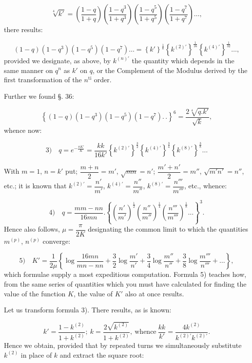 \documentclass{article}
\begin{document}
\[
\sqrt[4]{k'}=\left(\frac{1-q}{1+q}\right)\left(\frac{1-q^{3}}{1+q^{3}}\right)\left(\frac{1-q^{5}}{1+q^{5}}\right)\left(\frac{1-q^{7}}{1+q^{7}}\right)\ldots,
\]
there results:

\[
(1-q)(1-q^{3})(1-q^{5})(1-q^{7})\ldots=\left\{k'\right\}^{\frac{1}{8}}\left\{k^{(2)\prime}\right\}^{\frac{1}{16}}\left\{k^{(4)\prime}\right\}^{\frac{1}{32}}\ldots,
\]
provided we designate, as above, by $k^{(n)\prime}$ the quantity which depends in the same manner on $q^{n}$ as $k'$ on $q$, or the Complement of the Modulus derived by the first transformation of the $n^{\mathrm{ti}}$ order.

Further we found §. 36:

\[
\left\{(1-q)(1-q^{3})(1-q^{5})(1-q^{7}).\,.\right\}^{6}=\frac{2\sqrt[4]{q.k'}}{\sqrt{k}},
\]
whence now:

\[
\text{3)}\quad q=e^{-\frac{\pi K'}{K}}=\frac{kk}{16k'}\left\{k^{(2)\prime}\right\}^{\frac{3}{2}}\left\{k^{(4)\prime}\right\}^{\frac{3}{4}}\left\{k^{(8)\prime}\right\}^{\frac{3}{8}}\ldots
\]

With $m=1$, $n=k'$ put; $\dfrac{m+n}{2}=m'$, $\sqrt{mn}=n'$; $\dfrac{m'+n'}{2}=m''$, $\sqrt{m'n'}=n''$, etc.; it is known that $k^{(2)\prime}=\dfrac{n'}{m'}$, $k^{(4)\prime}=\dfrac{n''}{m''}$, $k^{(8)\prime}=\dfrac{n'''}{m'''}$, etc., whence:

\[
\text{4)}\quad q=\frac{mm-nn}{16mn}.\left\{\left(\frac{n'}{m'}\right)^{\frac{1}{2}}\left(\frac{n''}{m''}\right)^{\frac{1}{4}}\left(\frac{n'''}{m'''}\right)^{\frac{1}{8}}\ldots\right\}^{3}.
\]
Hence also follows, $\mu=\dfrac{\pi}{2K}$ designating the common limit to which the quantities $m^{(p)}$, $n^{(p)}$ converge:

\[
\text{5)}\quad K'=\frac{1}{2\mu}\left\{\log\frac{16mn}{mn-nn}+\frac{3}{2}\log\frac{m'}{n'}+\frac{3}{4}\log\frac{m''}{n''}+\frac{3}{8}\log\frac{m'''}{n'''}+\ldots\right\},
\]
which formulae supply a most expeditious computation. Formula 5) teaches how, from the same series of quantities which you must have calculated for finding the value of the function $K$, the value of $K'$ also at once results.

Let us transform formula 3). There results, as is known:

\[
k'=\frac{1-k^{(2)}}{1+k^{(2)}};\ k=\frac{2\sqrt{k^{(2)}}}{1+k^{(2)}},\ \text{whence}\ \frac{kk}{k'}=\frac{4k^{(2)}}{k^{(2)\prime}k^{(2)\prime}}.
\]
Hence we obtain, provided that by repeated turns we simultaneously substitute $k^{(2)}$ in place of $k$ and extract the square root:
\end{document}
